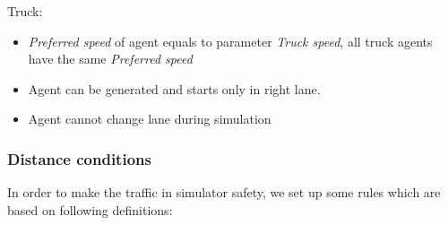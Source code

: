 Truck:

\begin{itemize}
\item \textit{Preferred speed} of agent equals to parameter \textit{Truck speed}, all truck agents have the same \textit{Preferred speed}
\item Agent can be generated and starts only in right lane.
\item Agent cannot change lane during simulation
\end{itemize}

\subsubsection{Distance conditions}

In order to make the traffic in simulator safety, we set up some rules which are based on following definitions:

